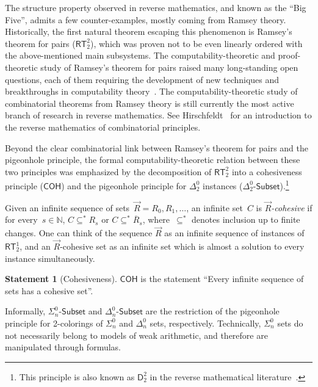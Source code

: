 \documentclass{article}
\def\NN{\mathbb{N}}
\newcommand{\Sub}[1]{{#1}\mbox{-}\mathsf{Subset}}
\newcommand{\COH}{\mathsf{COH}}
\newcommand{\RT}{\mathsf{RT}}
\def\qt#1{``#1''}%
\numberwithin{theorem}{section}
\theoremstyle{definition}
\newtheorem{statement}[theorem]{Statement}
\begin{document}
The structure property observed in reverse mathematics, and known as the \qt{Big Five}, admits a few counter-examples, mostly coming from Ramsey theory. Historically, the first natural theorem escaping this phenomenon is Ramsey's theorem for pairs ($\RT^2_2$), which was proven not to be even linearly ordered with the above-mentioned main subsystems. The computability-theoretic and proof-theoretic study of Ramsey's theorem for pairs raised many long-standing open questions, each of them requiring the development of new techniques and breakthroughs in computability theory~\cite{seetapun1995strength,cholak2001strength,liu2012rt22,monin2021srt}. The computability-theoretic study of combinatorial theorems from Ramsey theory is still currently the most active branch of research in reverse mathematics. See Hirschfeldt~\cite{hirschfeldt2015slicing} for an introduction to the reverse mathematics of combinatorial principles.

Beyond the clear combinatorial link between Ramsey's theorem for pairs and the pigeonhole principle, the formal computability-theoretic relation between these two principles was emphasized by the decomposition of $\RT^2_2$ into a cohesive\-ness principle ($\COH$) and the pigeonhole principle for $\Delta^0_2$ instances ($\Sub{\Delta^0_2}$).\footnote{This principle is also known as $\mathsf{D}^2_2$ in the reverse mathematical literature~\cite{cholak2001strength}.}

Given an infinite sequence of sets~$\vec{R} = R_0, R_1, \dots$, an infinite set~$C$ is \emph{$\vec{R}$-cohesive} if for every~$s \in \NN$, $C \subseteq^{*} R_s$ or $C \subseteq^{*} \overline{R}_s$, where~$\subseteq^{*}$ denotes inclusion up to finite changes. One can think of the sequence $\vec{R}$ as an infinite sequence of instances of $\RT^1_2$, and an $\vec{R}$-cohesive set as an infinite set which is almost a solution to every instance simultaneously.

\begin{statement}[Cohesiveness]
$\COH$ is the statement \qt{Every infinite sequence of sets has a cohesive set}.
\end{statement}


Informally, $\Sub{\Sigma^0_n}$ and $\Sub{\Delta^0_n}$ are the restriction of the pigeonhole principle for 2-colorings of $\Sigma^0_n$ and $\Delta^0_n$ sets, respectively. Technically, $\Sigma^0_n$ sets do not necessarily belong to models of weak arithmetic, and therefore are manipulated through formulas.
\end{document}
